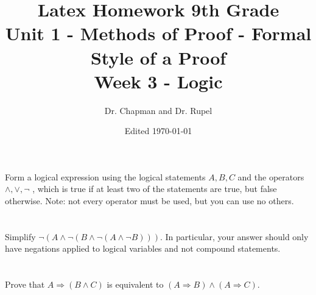 \documentclass{article}
\title{Latex Homework 9th Grade\\ Unit 1 - Methods of Proof - Formal Style of a Proof\\ Week 3 - Logic}
\author{Dr. Chapman and Dr. Rupel}
\date{Edited \today}
\begin{document}
\maketitle

\section{}
    Form a logical expression using the logical statements \(A,B,C\) and the operators \(\wedge,\vee,\neg\) , which is true if at least two of the statements are true, but false otherwise. Note: not every operator must be used, but you can use no others.

\section{}
    Simplify \(\neg(A\wedge\neg(B\wedge\neg(A\wedge\neg B)))\). In particular, your answer should only have negations applied to logical variables and not compound statements.
    
\section{}
    Prove that \(A\Rightarrow(B\wedge C)\) is equivalent to \((A\Rightarrow B)\wedge(A\Rightarrow C)\).
    
\end{document}
